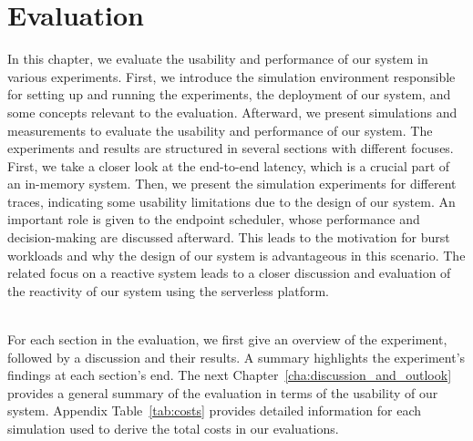\chapter{Evaluation}
\label{cha:evaluation}
In this chapter, we evaluate the usability and performance of our system in various experiments. First, we introduce the simulation environment responsible for setting up and running the experiments, the deployment of our system, and some concepts relevant to the evaluation. Afterward, we present simulations and measurements to evaluate the usability and performance of our system. The experiments and results are structured in several sections with different focuses. First, we take a closer look at the end-to-end latency, which is a crucial part of an in-memory system. Then, we present the simulation experiments for different traces, indicating some usability limitations due to the design of our system. An important role is given to the endpoint scheduler, whose performance and decision-making are discussed afterward. This leads to the motivation for burst workloads and why the design of our system is advantageous in this scenario. The related focus on a reactive system leads to a closer discussion and evaluation of the reactivity of our system using the serverless platform. 

~\\
For each section in the evaluation, we first give an overview of the experiment, followed by a discussion and their results. A summary highlights the experiment's findings at each section's end. The next Chapter~\ref{cha:discussion_and_outlook} provides a general summary of the evaluation in terms of the usability of our system. Appendix Table~\ref{tab:costs} provides detailed information for each simulation used to derive the total costs in our evaluations. 

